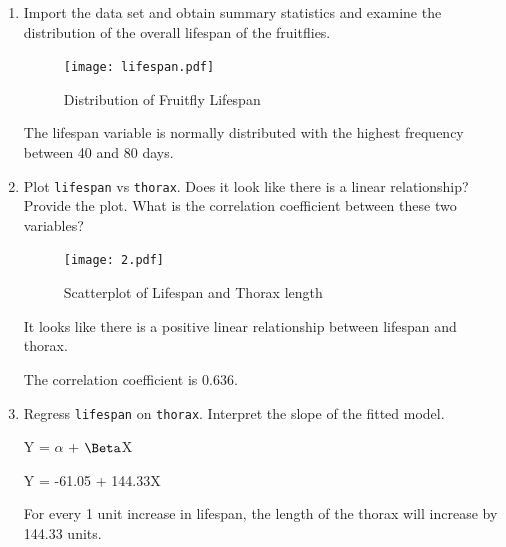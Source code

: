 \documentclass[12pt,letterpaper]{article}
\begin{document}
\begin{enumerate}
	
	\item
	Import the data set and obtain summary statistics and examine the distribution of the overall lifespan of the fruitflies.  
	
	
	
	\newpage
	\begin{figure}[h!]\centering
	\caption{\footnotesize Distribution of Fruitfly Lifespan}
		\label{fig:plot_2}
	\texttt{[image: lifespan.pdf]}
		\end{figure}
		
	The lifespan variable is normally distributed with the highest frequency between 40 and 80 days.

	\item
	Plot \texttt{lifespan} vs \texttt{thorax}. Does it look like there is a linear relationship? Provide the plot. What is the correlation coefficient between these two variables?
		\vspace{.5cm}
	
		
		
		\begin{figure}[h!]\centering
	\caption{\footnotesize Scatterplot of Lifespan and Thorax length}
		\label{fig:plot_2}
	\texttt{[image: 2.pdf]}
		\end{figure}

		It looks like there is a positive linear relationship between lifespan and thorax.
		
		\vspace{.5cm}
		
		
		
		The correlation coefficient is 0.636.
		
		\vspace{.5cm}
	
	\item
	Regress \texttt{lifespan} on \texttt{thorax}.  Interpret the slope of the fitted model.
	
	Y = $\alpha$ + $\Beta$X
	
	\vspace{.15cm}
	Y = -61.05 + 144.33X
	
	\vspace{.15cm}
	For every 1 unit increase in lifespan, the length of the thorax will increase by 144.33 units.
	

\end{enumerate}
\end{document}
